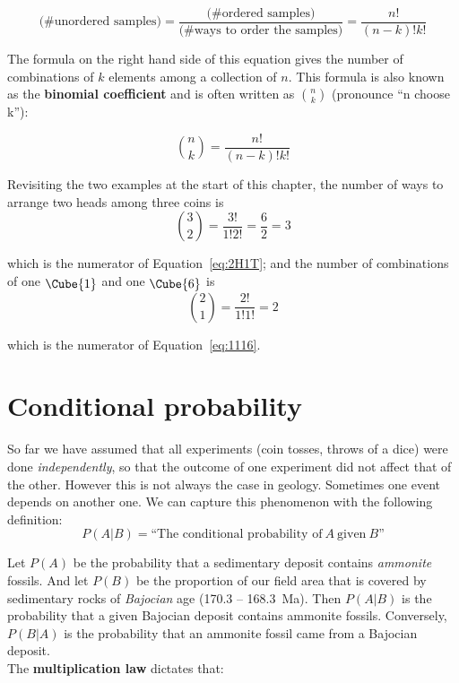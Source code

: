 \[
\mbox{
  (\# unordered samples)} =
\frac{\mbox{(\# ordered samples)}}{\mbox{(\# ways to order the samples)}
} =
\frac{n!}{(n-k)!k!}
\]

The formula on the right hand side of this equation gives the number
of combinations of $k$ elements among a collection of $n$.  This
formula is also known as the \textbf{binomial coefficient} and is
often written as $\binom{n}{k}$ (pronounce ``n choose k''):

\begin{equation}
  \binom{n}{k} = \frac{n!}{(n-k)!k!}
  \label{eq:nchoosek}
\end{equation}

Revisiting the two examples at the start of this chapter, the number
of ways to arrange two heads among three coins is
\[
\binom{3}{2} = \frac{3!}{1!2!} = \frac{6}{2} = 3
\]

\noindent which is the numerator of Equation~\ref{eq:2H1T}; and the
number of combinations of one $\raisebox{-2pt}{\Cube{1}}$ and one
$\raisebox{-2pt}{\Cube{6}}$ is
\[
\binom{2}{1} = \frac{2!}{1!1!} = 2
\]

\noindent which is the numerator of Equation~\ref{eq:1116}.

\section{Conditional probability}
\label{sec:conditionalprobability}

So far we have assumed that all experiments (coin tosses, throws of a
dice) were done \emph{independently}, so that the outcome of one
experiment did not affect that of the other. However this is not
always the case in geology. Sometimes one event depends on another
one. We can capture this phenomenon with the following definition:
\begin{equation}
P(A|B) = \mbox{``The conditional probability of}~A~\mbox{given}~B\mbox{''}
\end{equation}

Let $P(A)$ be the probability that a sedimentary deposit contains
\emph{ammonite} fossils.  And let $P(B)$ be the proportion of our
field area that is covered by sedimentary rocks of \emph{Bajocian} age
(170.3 -- 168.3~Ma). Then $P(A|B)$ is the probability that a given
Bajocian deposit contains ammonite fossils. Conversely, $P(B|A)$ is
the probability that an ammonite fossil came from a Bajocian
deposit.\\

The \textbf{multiplication law} dictates that:

